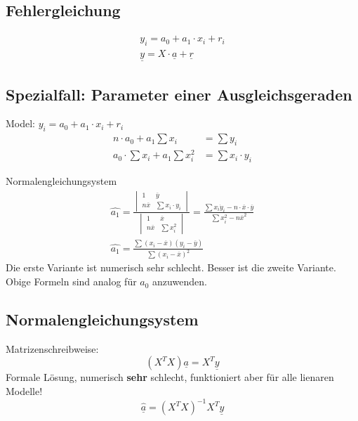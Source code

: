 \subsection{Fehlergleichung}
\begin{align}
  y_i = a_0 + a_1 \cdot x_i + r_i \\
  \underline{y} = X\cdot\underline{a} + \underline{r}
\end{align}

\subsection{Spezialfall: Parameter einer Ausgleichsgeraden}
Model: $y_i = a_0 + a_1 \cdot x_i + r_i$
\begin{align}
  n\cdot a_0 + a_1\sum x_i &= \sum y_i \\
  a_0\cdot\sum x_i + a_1\sum x_i^2 &= \sum x_i\cdot y_i
\end{align}

Normalengleichungsystem
\begin{gather}
  \hat{a_1} = \frac{\begin{vmatrix}1 & \overline{y} \\ n\overline{x} & \sum x_i\cdot y_i \end{vmatrix}}
	{\begin{vmatrix} 1 & \overline{x} \\ n\overline{x} & \sum x_i^2 \end{vmatrix}} = 
	\frac{\sum x_i\dot y_i - n\cdot\overline{x}\cdot\overline{y}}{\sum x_i^2 - n\overline{x}^2} \\
  \hat{a_1} = \frac{\sum (x_i - \overline{x})(y_i - \overline{y})}{\sum (x_i - \overline{x})^2}
\end{gather}
Die erste Variante ist numerisch sehr schlecht. Besser ist die zweite Variante.
Obige Formeln sind analog f\"ur $a_0$ anzuwenden.


\subsection{Normalengleichungsystem}
Matrizenschreibweise:
\begin{equation}
  (X^TX)\underline{a} = X^T\underline{y}
\end{equation}
Formale L\"osung, numerisch \textbf{sehr} schlecht, funktioniert aber f\"ur alle lienaren Modelle!
\begin{equation}
  \hat{\underline{a}} = {(X^TX)}^{-1}X^T\underline{y}
\end{equation}

